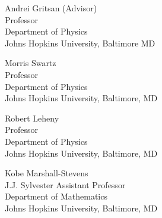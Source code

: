 \begin{singlespace}


    

    
    Andrei Gritsan (Advisor) \\
    \null\quad\quad Professor \\
    \null\quad\quad Department of Physics\\
    \null\quad\quad Johns Hopkins University, Baltimore MD 


    \vspace{0.1in}
    
    Morris Swartz\\
    \null\quad\quad Professor \\
    \null\quad\quad Department of Physics \\
    \null\quad\quad Johns Hopkins University, Baltimore, MD 
    
    \vspace{0.1in}
    
    Robert Leheny \\
    \null\quad\quad Professor \\
    \null\quad\quad Department of Physics \\
    \null\quad\quad Johns Hopkins University, Baltimore, MD 

    \vspace{0.1in}

    Kobe Marshall-Stevens \\
    \null\quad\quad J.J. Sylvester Assistant Professor \\
    \null\quad\quad Department of Mathematics \\
    \null\quad\quad Johns Hopkins University, Baltimore, MD 
    

\end{singlespace}
